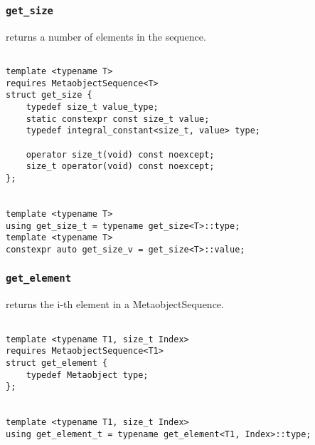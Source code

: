 
\subsubsection{\texttt{get\_size}}

returns a number of elements in the sequence.

\begin{verbatim}

template <typename T>
requires MetaobjectSequence<T>
struct get_size {
	typedef size_t value_type;
	static constexpr const size_t value;
	typedef integral_constant<size_t, value> type;

	operator size_t(void) const noexcept;
	size_t operator(void) const noexcept;
};


template <typename T>
using get_size_t = typename get_size<T>::type;
template <typename T>
constexpr auto get_size_v = get_size<T>::value;

\end{verbatim}

\subsubsection{\texttt{get\_element}}

returns the i-th element in a MetaobjectSequence.

\begin{verbatim}

template <typename T1, size_t Index>
requires MetaobjectSequence<T1>
struct get_element {
	typedef Metaobject type;
};


template <typename T1, size_t Index>
using get_element_t = typename get_element<T1, Index>::type;

\end{verbatim}
